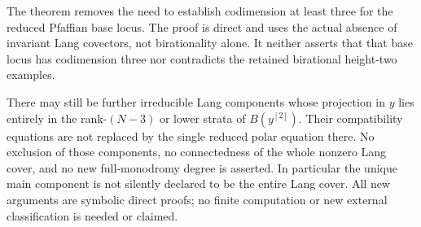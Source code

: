\begin{remark}
\label{rem:DE-Lang-polar-irreducibility-scope}
The theorem removes the need to establish codimension at least
three for the reduced Pfaffian base locus. The proof is direct
and uses the actual absence of invariant Lang covectors, not
birationality alone. It neither asserts that that base locus has
codimension three nor contradicts the retained birational
height-two examples.

There may still be further irreducible Lang components whose
projection in \(y\) lies entirely in the rank-\((N-3)\) or
lower strata of \(B(y^{[2]})\). Their compatibility equations
are not replaced by the single reduced polar equation there.
No exclusion of those components, no connectedness of the whole
nonzero Lang cover, and no new full-monodromy degree is asserted.
In particular the unique main component is not silently declared
to be the entire Lang cover. All new arguments are symbolic direct
proofs; no finite computation or new external classification is
needed or claimed.
\end{remark}
